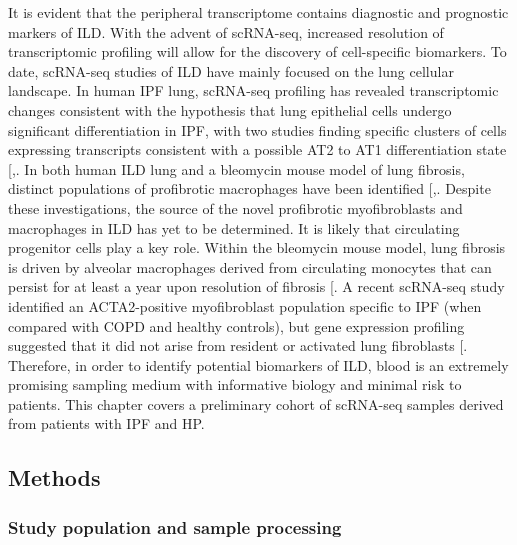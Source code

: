 \documentclass[
]{article}
\begin{document}
It is evident that the peripheral transcriptome contains diagnostic and prognostic markers of ILD. With the advent of scRNA-seq, increased resolution of transcriptomic profiling will allow for the discovery of cell-specific biomarkers. To date, scRNA-seq studies of ILD have mainly focused on the lung cellular landscape. In human IPF lung, scRNA-seq profiling has revealed transcriptomic changes consistent with the hypothesis that lung epithelial cells undergo significant differentiation in IPF, with two studies finding specific clusters of cells expressing transcripts consistent with a possible AT2 to AT1 differentiation state {[},\citeproc{ref-habermann_single-cell_2020}{152}{]}. In both human ILD lung and a bleomycin mouse model of lung fibrosis, distinct populations of profibrotic macrophages have been identified {[},\citeproc{ref-reyfman_single-cell_2019}{154}{]}. Despite these investigations, the source of the novel profibrotic myofibroblasts and macrophages in ILD has yet to be determined. It is likely that circulating progenitor cells play a key role. Within the bleomycin mouse model, lung fibrosis is driven by alveolar macrophages derived from circulating monocytes that can persist for at least a year upon resolution of fibrosis {[}\citeproc{ref-misharin_monocyte-derived_2017}{155}{]}. A recent scRNA-seq study identified an ACTA2-positive myofibroblast population specific to IPF (when compared with COPD and healthy controls), but gene expression profiling suggested that it did not arise from resident or activated lung fibroblasts {[}\citeproc{ref-adams_single-cell_2020}{156}{]}. Therefore, in order to identify potential biomarkers of ILD, blood is an extremely promising sampling medium with informative biology and minimal risk to patients. This chapter covers a preliminary cohort of scRNA-seq samples derived from patients with IPF and HP.

\subsection{Methods}\label{methods-3}

\subsubsection{Study population and sample processing}\label{study-population-and-sample-processing-2}
\end{document}
